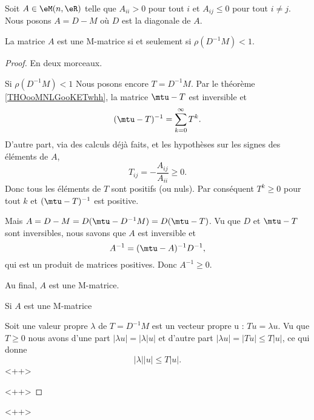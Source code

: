 \begin{proposition}
    Soit \( A\in \eM(n,\eR)\) telle que \( A_{ii}>0\) pour tout \( i\) et \( A_{ij}\leq 0\) pour tout \( i\neq j\). Nous posons \( A=D-M\) où \( D\) est la diagonale de \( A\). 

    La matrice \( A\) est une M-matrice si et seulement si \( \rho(D^{-1}M)<1\).
\end{proposition}

\begin{proof}
    En deux morceaux.
    \begin{subproof}
        \item[Si \( \rho(D^{-1}M)<1\)]
            Nous posons encore \( T=D^{-1}M\). Par le théorème \ref{THOooMNLGooKETwhh}, la matrice \( \mtu-T\) est inversible et
            \begin{equation}
                (\mtu-T)^{-1}=\sum_{k=0}^{\infty}T^k.
            \end{equation}
            D'autre part, via des calculs déjà faits, et les hypothèses sur les signes des éléments de \( A\),
            \begin{equation}
                T_{ij}=-\frac{ A_{ij} }{ A_{ii} }\geq 0.
            \end{equation}
            Donc tous les éléments de \( T\) sont positifs (ou nuls). Par conséquent \( T^k\geq 0\) pour tout \( k\) et \( (\mtu-T)^{-1}\) est positive.

            Mais \( A=D-M=D(\mtu-D^{-1}M)=D(\mtu-T)\). Vu que \( D\) et \( \mtu-T\) sont inversibles, nous savons que \( A\) est inversible et
            \begin{equation}
                A^{-1}=(\mtu-A)^{-1}D^{-1},
            \end{equation}
            qui est un produit de matrices positives. Donc \( A^{-1}\geq 0\).

            Au final, \( A\) est une M-matrice.

        \item[Si \( A\) est une M-matrice]


            Soit une valeur propre \( \lambda\) de \( T=D^{-1}M\) est un vecteur propre u : \( Tu=\lambda u\). Vu que \( T\geq 0\) nous avons d'une part \( | \lambda u |=| \lambda | u |\) et d'autre part \( | \lambda u |=| Tu |\leq T| u |\), ce qui donne
            \begin{equation}
                | \lambda | |u |\leq T| u |.
            \end{equation}
            <++>
        
    \end{subproof}
    <++>
\end{proof}
<++>

